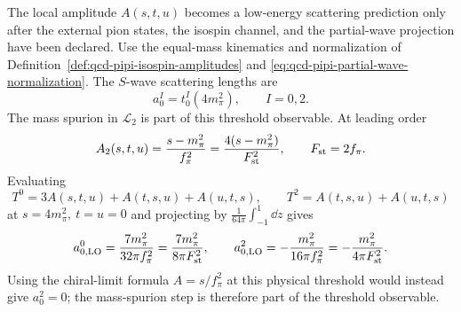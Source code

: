 \begin{controlledapproximation}
\label{ca:chpt-pion-threshold-observable-projection}
The local amplitude \(A(s,t,u)\) becomes a low-energy scattering prediction only
after the external pion states, the isospin channel, and the partial-wave
projection have been declared.  Use the equal-mass kinematics and normalization
of Definition~\ref{def:qcd-pipi-isospin-amplitudes} and
\eqref{eq:qcd-pipi-partial-wave-normalization}.  The \(S\)-wave scattering
lengths are
\[
  a_0^I=t_0^I(4m_\pi^2),
  \qquad I=0,2.
\]
The mass spurion in \(\mathcal L_2\) is part of this threshold observable.  At
leading order
\begin{equation}
  A_2(s,t,u)
  =
  \frac{s-m_\pi^2}{f_\pi^2}
  =
  \frac{4(s-m_\pi^2)}{F_{\rm st}^2},
  \qquad F_{\rm st}=2f_\pi .
  \label{eq:chpt-massive-leading-pion-amplitude}
\end{equation}
Evaluating
\[
  T^0=3A(s,t,u)+A(t,s,u)+A(u,t,s),
  \qquad
  T^2=A(t,s,u)+A(u,t,s)
\]
at \(s=4m_\pi^2,\ t=u=0\) and projecting by
\(\frac1{64\pi}\int_{-1}^{1}\dd z\) gives
\begin{equation}
  a_{0,\mathrm{LO}}^{0}
  =
  \frac{7m_\pi^2}{32\pi f_\pi^2}
  =
  \frac{7m_\pi^2}{8\pi F_{\rm st}^2},
  \qquad
  a_{0,\mathrm{LO}}^{2}
  =
  -\frac{m_\pi^2}{16\pi f_\pi^2}
  =
  -\frac{m_\pi^2}{4\pi F_{\rm st}^2}.
  \label{eq:chpt-weinberg-threshold-scattering-lengths}
\end{equation}
Using the chiral-limit formula \(A=s/f_\pi^2\) at this physical threshold would
instead give \(a_0^2=0\); the mass-spurion step is therefore part of the
threshold observable.


\end{controlledapproximation}
